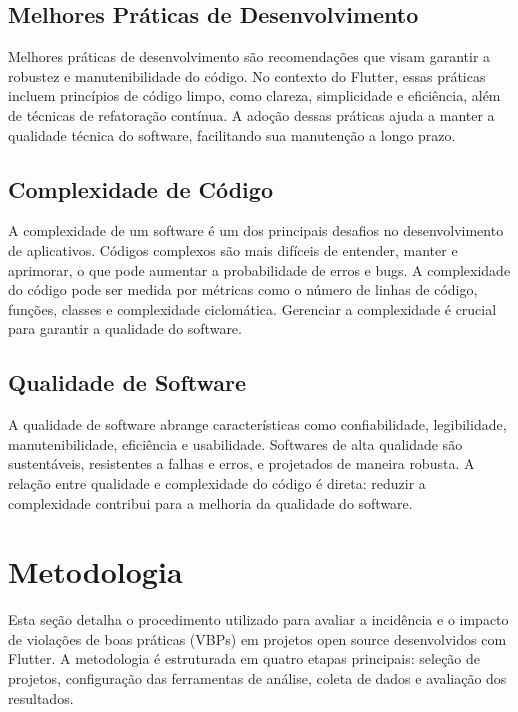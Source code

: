 \documentclass[12pt]{article}
\begin{document}
\subsection{Melhores Práticas de Desenvolvimento}
Melhores práticas de desenvolvimento são recomendações que visam garantir a robustez e manutenibilidade do código. No contexto do Flutter, essas práticas incluem princípios de código limpo, como clareza, simplicidade e eficiência, além de técnicas de refatoração contínua. A adoção dessas práticas ajuda a manter a qualidade técnica do software, facilitando sua manutenção a longo prazo.

\subsection{Complexidade de Código}
A complexidade de um software é um dos principais desafios no desenvolvimento de aplicativos. Códigos complexos são mais difíceis de entender, manter e aprimorar, o que pode aumentar a probabilidade de erros e bugs. A complexidade do código pode ser medida por métricas como o número de linhas de código, funções, classes e complexidade ciclomática. Gerenciar a complexidade é crucial para garantir a qualidade do software.

\subsection{Qualidade de Software}
A qualidade de software abrange características como confiabilidade, legibilidade, manutenibilidade, eficiência e usabilidade. Softwares de alta qualidade são sustentáveis, resistentes a falhas e erros, e projetados de maneira robusta. A relação entre qualidade e complexidade do código é direta: reduzir a complexidade contribui para a melhoria da qualidade do software.

\section{Metodologia}

Esta seção detalha o procedimento utilizado para avaliar a incidência e o impacto de violações de boas práticas (VBPs) em projetos open source desenvolvidos com Flutter. A metodologia é estruturada em quatro etapas principais: seleção de projetos, configuração das ferramentas de análise, coleta de dados e avaliação dos resultados.
\end{document}
